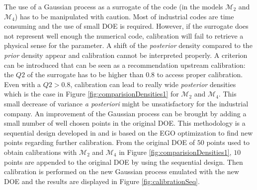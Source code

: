 \documentclass[soumission]{jsfds}
\begin{document}
The use of a Gaussian process as a surrogate of the code (in the models $\mathcal{M}_2$ and $\mathcal{M}_4$) has to be manipulated with caution. Most of industrial codes are time consuming and the use of small DOE is required. However, if the surrogate does not represent well enough the numerical code, calibration will fail to retrieve a physical sense for the parameter. A shift of the \textit{posterior} density compared to the \textit{prior} density appear and calibration cannot be interpreted properly. A criterion can be introduced that can be seen as a recommendation upstream calibration: the $Q2$ of the surrogate has to be higher than $0.8$ to access proper calibration. Even with a $Q2>0.8$, calibration can lead to really wide \textit{posterior} densities which is the case in Figure \ref{fig:comparisionDensities1} for $\mathcal{M}_2$ and $\mathcal{M}_4$. This small decrease of variance \textit{a posteriori} might be unsatisfactory for the industrial company. An improvement of the Gaussian process can be brought by adding a small number of well chosen points in the original DOE. This methodology is a sequential design developed in \citet{damblin2018} and is based on the EGO optimization to find new points regarding further calibration. From the original DOE of $50$ points used to obtain calibrations with $\mathcal{M}_2$ and $\mathcal{M}_4$ in Figure \ref{fig:comparisionDensities1}, $10$ points are appended to the original DOE by using the sequential design. Then calibration is performed on the new Gaussian process emulated with the new DOE and the results are displayed in Figure \ref{fig:calibrationSeq}. \newline
\end{document}
